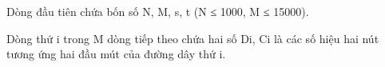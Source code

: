 Dòng đầu tiên chứa bốn số N, M, s, t (N ≤ 1000, M ≤ 15000).


Dòng thứ i trong M dòng tiếp theo chứa hai số Di, Ci là các số hiệu hai nút tương ứng hai đầu mút của đường dây thứ i.